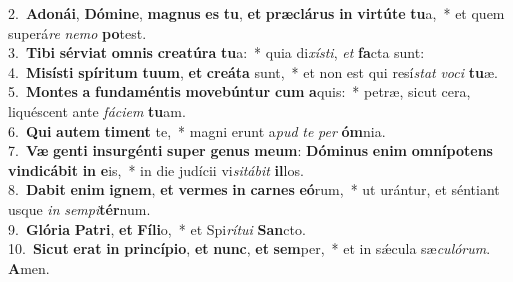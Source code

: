 {2.~}\textbf{A}\textbf{do}\textbf{ná}\textbf{i}, \textbf{Dó}\textbf{mi}\textbf{ne}, \textbf{ma}\textbf{gnus} \textbf{es} \textbf{tu}, \textbf{et} \textbf{præ}\textbf{clá}\textbf{rus} \textbf{in} \textbf{vir}\textbf{tú}\textbf{te} \textbf{tu}a,~* et quem superá\textit{re} \textit{ne}\textit{mo} \textbf{po}test.\\
{3.~}\textbf{Ti}\textbf{bi} \textbf{sér}\textbf{vi}\textbf{at} \textbf{om}\textbf{nis} \textbf{cre}\textbf{a}\textbf{tú}\textbf{ra} \textbf{tu}a:~* quia di\textit{xí}\textit{sti}, \textit{et} \textbf{fa}cta sunt:\\
{4.~}\textbf{Mi}\textbf{sí}\textbf{sti} \textbf{spí}\textbf{ri}\textbf{tum} \textbf{tu}\textbf{um}, \textbf{et} \textbf{cre}\textbf{á}\textbf{ta} sunt,~* et non est qui resí\textit{stat} \textit{vo}\textit{ci} \textbf{tu}æ.\\
{5.~}\textbf{Mon}\textbf{tes} \textbf{a} \textbf{fun}\textbf{da}\textbf{mén}\textbf{tis} \textbf{mo}\textbf{ve}\textbf{bún}\textbf{tur} \textbf{cum} \textbf{a}quis:~* petræ, sicut cera, liquéscent ante \textit{fá}\textit{ci}\textit{em} \textbf{tu}am.\\
{6.~}\textbf{Qui} \textbf{au}\textbf{tem} \textbf{ti}\textbf{ment} te,~* magni erunt a\textit{pud} \textit{te} \textit{per} \textbf{óm}nia.\\
{7.~}\textbf{Væ} \textbf{gen}\textbf{ti} \textbf{in}\textbf{sur}\textbf{gén}\textbf{ti} \textbf{su}\textbf{per} \textbf{ge}\textbf{nus} \textbf{me}\textbf{um}: \textbf{Dó}\textbf{mi}\textbf{nus} \textbf{e}\textbf{nim} \textbf{om}\textbf{ní}\textbf{po}\textbf{tens} \textbf{vin}\textbf{di}\textbf{cá}\textbf{bit} \textbf{in} \textbf{e}is,~* in die judícii vi\textit{si}\textit{tá}\textit{bit} \textbf{il}los.\\
{8.~}\textbf{Da}\textbf{bit} \textbf{e}\textbf{nim} \textbf{i}\textbf{gnem}, \textbf{et} \textbf{ver}\textbf{mes} \textbf{in} \textbf{car}\textbf{nes} \textbf{e}\textbf{ó}rum,~* ut urántur, et séntiant usque \textit{in} \textit{sem}\textit{pi}\textbf{tér}num.\\
{9.~}\textbf{Gló}\textbf{ri}\textbf{a} \textbf{Pa}\textbf{tri}, \textbf{et} \textbf{Fí}\textbf{li}o,~* et Spi\textit{rí}\textit{tu}\textit{i} \textbf{San}cto.\\
{10.~}\textbf{Si}\textbf{cut} \textbf{e}\textbf{rat} \textbf{in} \textbf{prin}\textbf{cí}\textbf{pi}\textbf{o}, \textbf{et} \textbf{nunc}, \textbf{et} \textbf{sem}per,~* et in sǽcula sæ\textit{cu}\textit{ló}\textit{rum}. \textbf{A}men.\\

